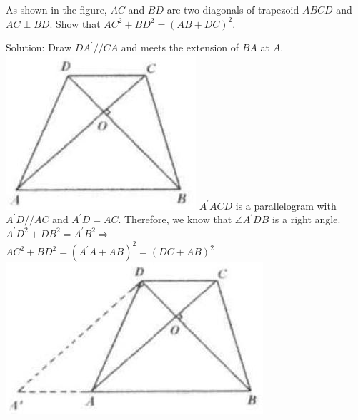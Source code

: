 \documentclass{article}
\begin{document}
As shown in the figure, \(A C\) and \(B D\) are two diagonals of trapezoid \(A B C D\) and \(A C \perp B D\). Show that \(A C^{2}+B D^{2}=(A B+D C)^{2}\).

Solution:
Draw \(D A^{\prime} / / C A\) and meets the extension of \(B A\) at \(A\).\\
\includegraphics[width=\textwidth]{images/117.jpg} \(A^{\prime} A C D\) is a parallelogram with \(A^{\prime} D / / A C\) and \(A^{\prime} D=A C\). Therefore, we know that \(\angle A^{\prime} D B\) is a right angle.\\
\(A^{\prime} D^{2}+D B^{2}=A^{\prime} B^{2} \Rightarrow\)\\
\(A C^{2}+B D^{2}=\left(A^{\prime} A+A B\right)^{2}=(D C+A B)^{2}\)\\
\centering
\includegraphics[width=\textwidth]{images/117(3).jpg}
\end{document}
